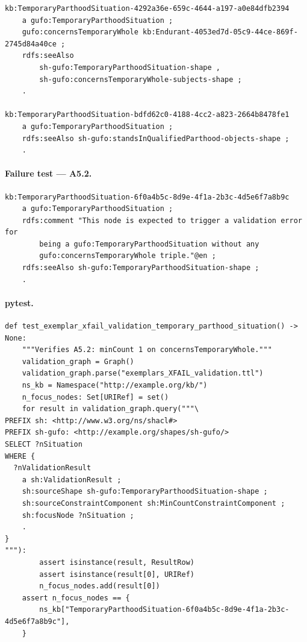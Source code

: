 \documentclass[12pt,a4paper]{article}
\begin{document}
\begin{lstlisting}[style=turtlestyle]
kb:TemporaryParthoodSituation-4292a36e-659c-4644-a197-a0e84dfb2394
    a gufo:TemporaryParthoodSituation ;
    gufo:concernsTemporaryWhole kb:Endurant-4053ed7d-05c9-44ce-869f-2745d84a40ce ;
    rdfs:seeAlso
        sh-gufo:TemporaryParthoodSituation-shape ,
        sh-gufo:concernsTemporaryWhole-subjects-shape ;
    .

kb:TemporaryParthoodSituation-bdfd62c0-4188-4cc2-a823-2664b8478fe1
    a gufo:TemporaryParthoodSituation ;
    rdfs:seeAlso sh-gufo:standsInQualifiedParthood-objects-shape ;
    .
\end{lstlisting}

\paragraph{Failure test --- A5.2.}

\begin{lstlisting}[style=turtlestyle]
kb:TemporaryParthoodSituation-6f0a4b5c-8d9e-4f1a-2b3c-4d5e6f7a8b9c
    a gufo:TemporaryParthoodSituation ;
    rdfs:comment "This node is expected to trigger a validation error for
        being a gufo:TemporaryParthoodSituation without any
        gufo:concernsTemporaryWhole triple."@en ;
    rdfs:seeAlso sh-gufo:TemporaryParthoodSituation-shape ;
    .
\end{lstlisting}

\paragraph{pytest.}

\begin{lstlisting}[style=pythonstyle]
def test_exemplar_xfail_validation_temporary_parthood_situation() -> None:
    """Verifies A5.2: minCount 1 on concernsTemporaryWhole."""
    validation_graph = Graph()
    validation_graph.parse("exemplars_XFAIL_validation.ttl")
    ns_kb = Namespace("http://example.org/kb/")
    n_focus_nodes: Set[URIRef] = set()
    for result in validation_graph.query("""\
PREFIX sh: <http://www.w3.org/ns/shacl#>
PREFIX sh-gufo: <http://example.org/shapes/sh-gufo/>
SELECT ?nSituation
WHERE {
  ?nValidationResult
    a sh:ValidationResult ;
    sh:sourceShape sh-gufo:TemporaryParthoodSituation-shape ;
    sh:sourceConstraintComponent sh:MinCountConstraintComponent ;
    sh:focusNode ?nSituation ;
    .
}
"""):
        assert isinstance(result, ResultRow)
        assert isinstance(result[0], URIRef)
        n_focus_nodes.add(result[0])
    assert n_focus_nodes == {
        ns_kb["TemporaryParthoodSituation-6f0a4b5c-8d9e-4f1a-2b3c-4d5e6f7a8b9c"],
    }
\end{lstlisting}
\end{document}
